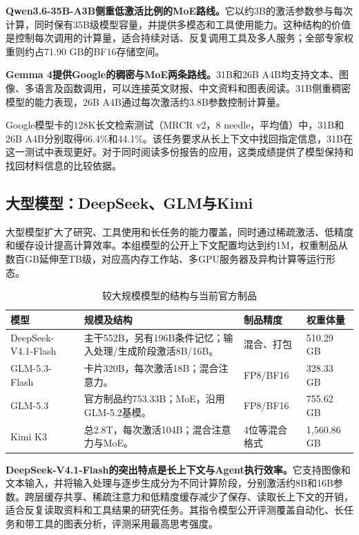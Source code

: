 \textbf{Qwen3.6-35B-A3B侧重低激活比例的MoE路线。}它以约3B的激活参数参与每次计算，同时保有35B级模型容量，并提供多模态和工具使用能力。这种结构的价值是控制每次调用的计算量，适合持续对话、反复调用工具及多人服务；全部专家权重则约占71.90 GB的BF16存储空间。

\textbf{Gemma 4提供Google的稠密与MoE两条路线。}31B和26B A4B均支持文本、图像、多语言及函数调用，可以连接英文财报、中文资料和图表阅读。31B侧重稠密模型的能力表现，26B A4B通过每次激活约3.8B参数控制计算量。

Google模型卡的128K长文检索测试（MRCR v2，8 needle，平均值）中，31B和26B A4B分别取得66.4\%和44.1\%。该任务要求从长上下文中找回指定信息，31B在这一测试中表现更好。对于同时阅读多份报告的应用，这类成绩提供了模型保持和找回材料信息的比较依据。

\subsection{大型模型：DeepSeek、GLM与Kimi}
大型模型扩大了研究、工具使用和长任务的能力覆盖，同时通过稀疏激活、低精度和缓存设计提高计算效率。本组模型的公开上下文配置均达到约1M，权重制品从数百GB延伸至TB级，对应高内存工作站、多GPU服务器及异构计算等运行形态。

\begin{table}[H]\small\centering
\caption{较大规模模型的结构与当前官方制品}\label{tab:shared-models}
\begin{tabularx}{\linewidth}{@{}P{34mm}Y P{24mm}P{22mm}@{}}\toprule
模型 & 规模及结构 & 制品精度 & 权重体量\\\midrule
DeepSeek-V4.1-Flash & 主干552B，另有196B条件记忆；输入处理/生成阶段激活8B/16B。 & 混合、打包 & 510.29 GB\\
GLM-5.3-Flash & 卡片320B，每次激活18B；混合注意力。 & FP8/BF16 & 328.33 GB\\
GLM-5.3 & 官方制品约753.33B；MoE，沿用GLM-5.2基模。 & FP8/BF16 & 755.62 GB\\
Kimi K3 & 总2.8T，每次激活104B；混合注意力与MoE。 & 4位等混合格式 & 1,560.86 GB\\\bottomrule
\end{tabularx}
\end{table}

\textbf{DeepSeek-V4.1-Flash的突出特点是长上下文与Agent执行效率。}它支持图像和文本输入，并将输入处理与逐步生成分为不同计算阶段，分别激活约8B和16B参数。跨层缓存共享、稀疏注意力和低精度缓存减少了保存、读取长上下文的开销，适合反复读取资料和工具结果的研究任务。其指令模型公开评测覆盖自动化、长任务和带工具的图表分析，评测采用最高思考强度。

